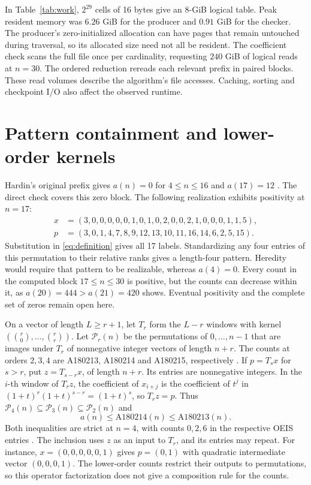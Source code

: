 \documentclass[11pt]{article}
\begin{document}
In Table~\ref{tab:work}, \(2^{29}\) cells of 16 bytes give an \(8\)-GiB
logical table. Peak resident memory was \(6.26\) GiB for the producer
and \(0.91\) GiB for the checker. The producer's zero-initialized allocation
can have pages that remain untouched during traversal, so its allocated
size need not all be resident. The coefficient check scans the full file once
per cardinality, requesting \(240\) GiB of logical reads at \(n=30\).
The ordered reduction rereads each relevant prefix in paired blocks.
These read volumes describe the algorithm's file accesses. Caching,
sorting and checkpoint I/O also affect the observed runtime.

\section{Pattern containment and lower-order kernels}

Hardin's original prefix gives \(a(n)=0\) for \(4\leq n\leq16\) and
\(a(17)=12\) \cite{hardin215}. The direct check covers this zero block.
The following realization exhibits positivity at \(n=17\):
\begin{align*}
 x&=(3,0,0,0,0,0,1,0,1,0,2,0,0,2,1,0,0,0,1,1,5),\\
 p&=(3,0,1,4,7,8,9,12,13,10,11,16,14,6,2,5,15).
\end{align*}
Substitution in \eqref{eq:definition} gives all 17 labels.
Standardizing any four entries of this permutation to their relative
ranks gives a length-four pattern. Heredity would require that pattern
to be realizable, whereas \(a(4)=0\).
Every count in the computed block \(17\le n\le30\) is positive,
but the counts can decrease within it, as \(a(20)=444>a(21)=420\) shows.
Eventual positivity and the complete set of zeros remain open here.

On a vector of length \(L\ge r+1\), let \(T_r\) form the \(L-r\) windows with
kernel \((\binom{r}{0},\ldots,\binom{r}{r})\).
Let \(\mathcal P_r(n)\) be the permutations of \(0,\ldots,n-1\) that
are images under \(T_r\) of nonnegative integer vectors of length \(n+r\).
The counts at orders \(2,3,4\) are A180213, A180214 and A180215,
respectively \cite{hardin213,hardin214,hardin215}.
If \(p=T_s x\) for \(s>r\), put \(z=T_{s-r}x\), of length \(n+r\).
Its entries are nonnegative integers. In the \(i\)-th window of \(T_rz\),
the coefficient of \(x_{i+j}\) is the coefficient of \(t^j\) in
\((1+t)^r(1+t)^{s-r}=(1+t)^s\), so \(T_rz=p\).
Thus \(\mathcal P_4(n)\subseteq\mathcal P_3(n)\subseteq\mathcal P_2(n)\)
and
\[
 a(n)\le \mathrm{A180214}(n)\le \mathrm{A180213}(n).
\]
Both inequalities are strict at \(n=4\), with counts \(0,2,6\) in
the respective OEIS entries \cite{hardin215,hardin214,hardin213}.
The inclusion uses \(z\) as an input to \(T_r\), and its entries
may repeat. For instance, \(x=(0,0,0,0,0,1)\)
gives \(p=(0,1)\) with quadratic intermediate vector \((0,0,0,1)\).
The lower-order counts restrict their outputs to permutations, so this
operator factorization does not give a composition rule for the counts.
\end{document}
